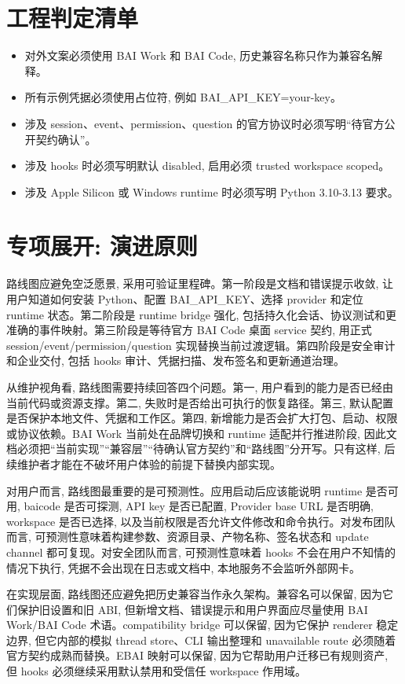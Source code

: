 \section{工程判定清单}
\begin{itemize}
  \item 对外文案必须使用 BAI Work 和 BAI Code, 历史兼容名称只作为兼容名解释。
  \item 所有示例凭据必须使用占位符, 例如 BAI\_API\_KEY=your-key。
  \item 涉及 session、event、permission、question 的官方协议时必须写明“待官方公开契约确认”。
  \item 涉及 hooks 时必须写明默认 disabled, 启用必须 trusted workspace scoped。
  \item 涉及 Apple Silicon 或 Windows runtime 时必须写明 Python 3.10-3.13 要求。
\end{itemize}

\section{专项展开: 演进原则}
路线图应避免空泛愿景, 采用可验证里程碑。第一阶段是文档和错误提示收敛, 让用户知道如何安装 Python、配置 BAI\_API\_KEY、选择 provider 和定位 runtime 状态。第二阶段是 runtime bridge 强化, 包括持久化会话、协议测试和更准确的事件映射。第三阶段是等待官方 BAI Code 桌面 service 契约, 用正式 session/event/permission/question 实现替换当前过渡逻辑。第四阶段是安全审计和企业交付, 包括 hooks 审计、凭据扫描、发布签名和更新通道治理。

从维护视角看, 路线图需要持续回答四个问题。第一, 用户看到的能力是否已经由当前代码或资源支撑。第二, 失败时是否给出可执行的恢复路径。第三, 默认配置是否保护本地文件、凭据和工作区。第四, 新增能力是否会扩大打包、启动、权限或协议依赖。BAI Work 当前处在品牌切换和 runtime 适配并行推进阶段, 因此文档必须把“当前实现”“兼容层”“待确认官方契约”和“路线图”分开写。只有这样, 后续维护者才能在不破坏用户体验的前提下替换内部实现。

对用户而言, 路线图最重要的是可预测性。应用启动后应该能说明 runtime 是否可用, baicode 是否可探测, API key 是否已配置, Provider base URL 是否明确, workspace 是否已选择, 以及当前权限是否允许文件修改和命令执行。对发布团队而言, 可预测性意味着构建参数、资源目录、产物名称、签名状态和 update channel 都可复现。对安全团队而言, 可预测性意味着 hooks 不会在用户不知情的情况下执行, 凭据不会出现在日志或文档中, 本地服务不会监听外部网卡。

在实现层面, 路线图还应避免把历史兼容当作永久架构。兼容名可以保留, 因为它们保护旧设置和旧 ABI, 但新增文档、错误提示和用户界面应尽量使用 BAI Work/BAI Code 术语。compatibility bridge 可以保留, 因为它保护 renderer 稳定边界, 但它内部的模拟 thread store、CLI 输出整理和 unavailable route 必须随着官方契约成熟而替换。EBAI 映射可以保留, 因为它帮助用户迁移已有规则资产, 但 hooks 必须继续采用默认禁用和受信任 workspace 作用域。

